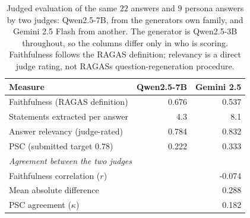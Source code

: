 \begin{table}[htbp]
\caption{Judged evaluation of the same $22$ answers and $9$ persona answers by two judges: Qwen2.5-7B, from the generator\textquotesingle{}s own family, and Gemini 2.5 Flash from another. The generator is Qwen2.5-3B throughout, so the columns differ only in who is scoring. Faithfulness follows the RAGAS definition; relevancy is a direct judge rating, not RAGAS\textquotesingle{}s question-regeneration procedure.}
\label{tab:judged}
\centering
\begin{tabular}{lrr}
\toprule
\textbf{Measure} & \textbf{Qwen2.5-7B} & \textbf{Gemini 2.5} \\
\midrule
Faithfulness (RAGAS definition) & 0.676 & 0.537 \\
Statements extracted per answer & 4.3 & 8.1 \\
Answer relevancy (judge-rated) & 0.784 & 0.832 \\
PSC (submitted target $0.78$) & 0.222 & 0.333 \\
\midrule
\multicolumn{3}{l}{\emph{Agreement between the two judges}} \\
Faithfulness correlation ($r$) & \multicolumn{2}{r}{-0.074} \\
Mean absolute difference & \multicolumn{2}{r}{0.288} \\
PSC agreement ($\kappa$) & \multicolumn{2}{r}{0.182} \\
\bottomrule
\end{tabular}
\end{table}
